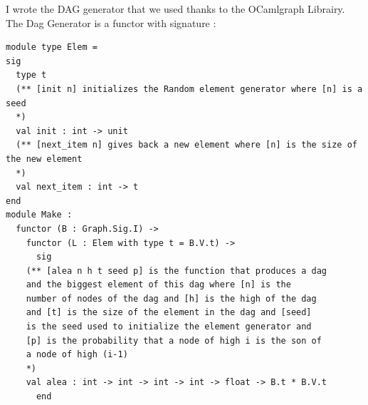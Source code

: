 I wrote the DAG generator that we used thanks to the OCamlgraph Librairy. The Dag Generator is a functor with signature :
\begin{lstlisting}
module type Elem = 
sig
  type t
  (** [init n] initializes the Random element generator where [n] is a seed
  *)
  val init : int -> unit
  (** [next_item n] gives back a new element where [n] is the size of the new element
  *)
  val next_item : int -> t
end
module Make :
  functor (B : Graph.Sig.I) ->
    functor (L : Elem with type t = B.V.t) ->
      sig
	(** [alea n h t seed p] is the function that produces a dag
	and the biggest element of this dag where [n] is the
	number of nodes of the dag and [h] is the high of the dag
	and [t] is the size of the element in the dag and [seed]
	is the seed used to initialize the element generator and
	[p] is the probability that a node of high i is the son of
	a node of high (i-1)
	*)
	val alea : int -> int -> int -> int -> float -> B.t * B.V.t
      end
\end{lstlisting}

